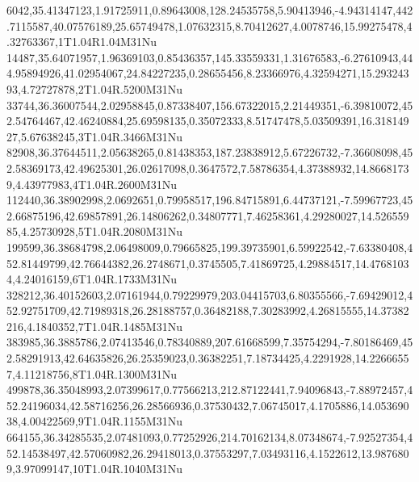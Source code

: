 6042,35.41347123,1.91725911,0.89643008,128.24535758,5.90413946,-4.94314147,442.7115587,40.07576189,25.65749478,1.07632315,8.70412627,4.0078746,15.99275478,4.32763367,1T1.04R1.04M31Nu
14487,35.64071957,1.96369103,0.85436357,145.33559331,1.31676583,-6.27610943,444.95894926,41.02954067,24.84227235,0.28655456,8.23366976,4.32594271,15.29324393,4.72727878,2T1.04R.5200M31Nu
33744,36.36007544,2.02958845,0.87338407,156.67322015,2.21449351,-6.39810072,452.54764467,42.46240884,25.69598135,0.35072333,8.51747478,5.03509391,16.31814927,5.67638245,3T1.04R.3466M31Nu
82908,36.37644511,2.05638265,0.81438353,187.23838912,5.67226732,-7.36608098,452.58369173,42.49625301,26.02617098,0.3647572,7.58786354,4.37388932,14.86681739,4.43977983,4T1.04R.2600M31Nu
112440,36.38902998,2.0692651,0.79958517,196.84715891,6.44737121,-7.59967723,452.66875196,42.69857891,26.14806262,0.34807771,7.46258361,4.29280027,14.52655985,4.25730928,5T1.04R.2080M31Nu
199599,36.38684798,2.06498009,0.79665825,199.39735901,6.59922542,-7.63380408,452.81449799,42.76644382,26.2748671,0.3745505,7.41869725,4.29884517,14.47681034,4.24016159,6T1.04R.1733M31Nu
328212,36.40152603,2.07161944,0.79229979,203.04415703,6.80355566,-7.69429012,452.92751709,42.71989318,26.28188757,0.36482188,7.30283992,4.26815555,14.37382216,4.1840352,7T1.04R.1485M31Nu
383985,36.3885786,2.07413546,0.78340889,207.61668599,7.35754294,-7.80186469,452.58291913,42.64635826,26.25359023,0.36382251,7.18734425,4.2291928,14.22666557,4.11218756,8T1.04R.1300M31Nu
499878,36.35048993,2.07399617,0.77566213,212.87122441,7.94096843,-7.88972457,452.24196034,42.58716256,26.28566936,0.37530432,7.06745017,4.1705886,14.05369038,4.00422569,9T1.04R.1155M31Nu
664155,36.34285535,2.07481093,0.77252926,214.70162134,8.07348674,-7.92527354,452.14538497,42.57060982,26.29418013,0.37553297,7.03493116,4.1522612,13.9876809,3.97099147,10T1.04R.1040M31Nu
